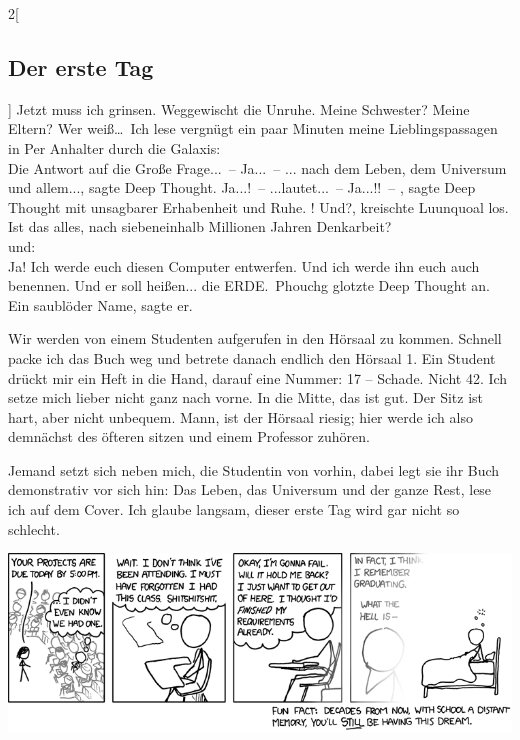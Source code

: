 \begin{multicols}{2}[\subsection{Der erste Tag}]
Jetzt muss ich grinsen. Weggewischt die Unruhe. Meine Schwester? Meine Eltern?
Wer weiß\dots\ Ich lese vergnügt ein paar Minuten meine Lieblingspassagen in
\glqq Per Anhalter durch die Galaxis\grqq: \\ \glqq \glq Die Antwort auf die
Große Frage...\grq\ -- \glq Ja...\grq\ -- \glq... nach dem Leben, dem Universum
und allem...\grq, sagte Deep Thought. \glq Ja...!\grq\ -- \glq...lautet...\grq\
-- \glq Ja...!!\grq\ -- \grq, sagte Deep Thought mit unsagbarer
Erhabenheit und Ruhe. \glq 42!  Und?\grq, kreischte Luunquoal los. \glq Ist das
alles, nach siebeneinhalb Millionen Jahren Denkarbeit?\grq\grqq\ \\ und: \\
\glqq \glq Ja!  Ich werde euch diesen Computer entwerfen. Und ich werde ihn
euch auch benennen.  Und er soll heißen... die ERDE.\grq\ Phouchg glotzte Deep
Thought an. \glq Ein saublöder Name\grq, sagte er.\grqq

Wir werden von einem Studenten aufgerufen in den Hörsaal zu kommen. Schnell
packe ich das Buch weg und betrete danach endlich den Hörsaal 1. Ein Student
drückt mir ein Heft in die Hand, darauf eine Nummer: 17 -- Schade. Nicht 42.
Ich setze mich lieber nicht ganz nach vorne. In die Mitte, das ist gut. Der
Sitz ist hart, aber nicht unbequem.  Mann, ist der Hörsaal riesig; hier werde
ich also demnächst des öfteren sitzen und einem Professor zuhören.

Jemand setzt sich neben mich, die Studentin von vorhin, dabei legt sie ihr Buch
demonstrativ vor sich hin: \glqq Das Leben, das Universum und der ganze
Rest\grqq, lese ich auf dem Cover.  Ich glaube langsam, dieser erste Tag wird
gar nicht so schlecht.

\begin{center}
\vfill\includegraphics[scale=0.4]{comics/557}
\end{center}

\end{multicols}
